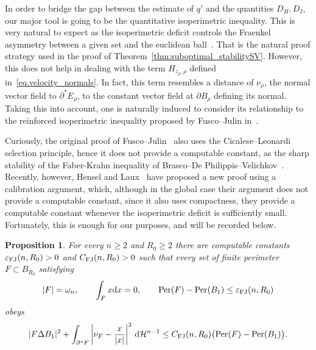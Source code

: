 \documentclass[11pt]{amsart}
\newcommand{\propname}{Proposition}
\theoremstyle{plain}
\newtheorem{proposition}[theorem]{\propname}
\theoremstyle{definition}
\newcommand{\dHn}{\,\dd\mathcal{H}^{n-1}}
\def\dd{{\rm d}}
\newcommand\Per{\mathop{\rm Per}}
\begin{document}
In order to bridge the gap between the estimate of $q'$ and the quantities $D_H,D_I$, our major tool is going to be the quantitative isoperimetric inequality. This is very natural to expect as the isoperimetric deficit controls the Fraenkel asymmetry between a given set and the euclidean ball~\cite{figalli2010mass}. That is the natural proof strategy used in the proof of Theorem~\ref{thm:suboptimal_stabilitySV}. However, this does not help in dealing with the term $H_{z_\rho, \rho}$ defined in~\eqref{eq.velocity_normals}. In fact, this term resembles a distance of $\nu_\rho$, the normal vector field to $\partial^* E_\rho$, to the constant vector field at $\partial B_\rho$ defining its normal. Taking this into account, one is naturally induced to consider its relationship to the reinforced isoperimetric inequality proposed by Fusco--Julin in~\cite{fusco2014strong}. 

Curiously, the original proof of Fusco--Julin~\cite{fusco2014strong} also uses the Cicalese--Leonardi selection principle, hence it does not provide a computable constant, as the sharp stability of the Faber-Krahn inequality of Brasco--De Philippis--Velichkov~\cite{brasco2015faber}. Recently, however, Hensel and Laux~\cite{hensel2026quantitative} have proposed a new proof using a calibration argument, which, although in the global case their argument does not provide a computable constant, since it also uses compactness, they provide a computable constant whenever the isoperimetric deficit is sufficiently small. Fortunately, this is enough for our purposes, and will be recorded below. 

 \begin{proposition}
 \label{prop.FJ-strong}
For every   $n\ge2$ and $R_0\ge2$ there are computable constants
$\varepsilon_{\rm FJ}(n,R_0)>0$ and $C_{\rm FJ}(n,R_0)>0$ such that every  set
of finite perimeter   $F\subset B_{R_0}$ satisfying
\[
 |F|=\omega_n,\qquad \int_Fx\dd x=0,
 \qquad \Per(F)-\Per(B_1)\le\varepsilon_{\rm FJ}(n,R_0)
\]
obeys
\begin{equation}\label{eq.FJ-exact}
 |F\Delta B_1|^2
 +\int_{\partial^*F}
 \left|\nu_F-\frac{x}{|x|}\right|^2\dHn
 \le C_{\rm FJ}(n,R_0)\bigl(\Per(F)-\Per(B_1)\bigr).
\end{equation}
\end{proposition}
\end{document}

